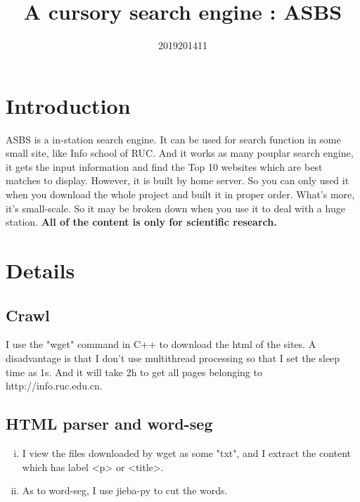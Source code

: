 \documentclass[a4paper]{article}
\title{A cursory search engine : ASBS}
\author{2019201411}
\begin{document}
\maketitle

\section{Introduction} ASBS is a in-station search engine. It can be used for search function in some small site, like Info school of RUC. And it works as many pouplar search engine, it gets the input information and find the Top 10 websites which are best matches to display. However, it is built by home server. So you can only used it when you download the whole project and built it in proper order. What's more, it's small-scale. So it may be broken down when you use it to deal with a huge station. \textbf{All of the content is only for scientific research.}

\section{Details}
\subsection {Crawl}
I use the "wget" command in C++ to download the html of the sites. A disadvantage is that I don't use multithread processing so that I set the sleep time as 1s. And it will take 2h to get all pages belonging to http://info.ruc.edu.cn.

\subsection {HTML parser and word-seg}
\begin{enumerate}[i)]
\item I view the files downloaded by wget as some "txt", and I extract the content which has label <p> or <title>.
\item As to word-seg, I use jieba-py to cut the words. 
\end {enumerate}
\end{document}
